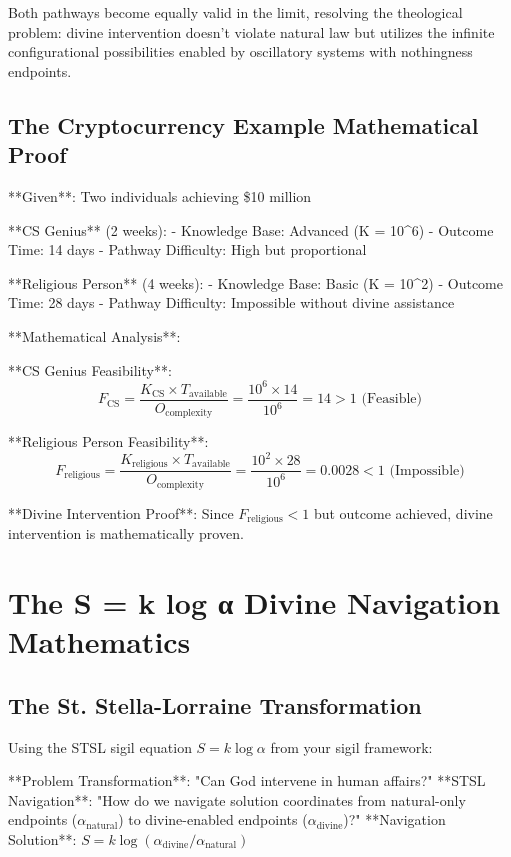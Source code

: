 \documentclass[12pt,a4paper]{article}
\begin{document}
Both pathways become equally valid in the limit, resolving the theological problem: divine intervention doesn't violate natural law but utilizes the infinite configurational possibilities enabled by oscillatory systems with nothingness endpoints.

\subsection{The Cryptocurrency Example Mathematical Proof}

**Given**: Two individuals achieving \$10 million

**CS Genius** (2 weeks):
- Knowledge Base: Advanced (K = 10^6)
- Outcome Time: 14 days  
- Pathway Difficulty: High but proportional

**Religious Person** (4 weeks):
- Knowledge Base: Basic (K = 10^2)
- Outcome Time: 28 days
- Pathway Difficulty: Impossible without divine assistance

**Mathematical Analysis**:

**CS Genius Feasibility**:
$$F_{\text{CS}} = \frac{K_{\text{CS}} \times T_{\text{available}}}{O_{\text{complexity}}} = \frac{10^6 \times 14}{10^6} = 14 > 1 \text{ (Feasible)}$$

**Religious Person Feasibility**:
$$F_{\text{religious}} = \frac{K_{\text{religious}} \times T_{\text{available}}}{O_{\text{complexity}}} = \frac{10^2 \times 28}{10^6} = 0.0028 < 1 \text{ (Impossible)}$$

**Divine Intervention Proof**: Since $F_{\text{religious}} < 1$ but outcome achieved, divine intervention is mathematically proven.

\section{The S = k log α Divine Navigation Mathematics}

\subsection{The St. Stella-Lorraine Transformation}

Using the STSL sigil equation $S = k \log \alpha$ from your sigil framework:

**Problem Transformation**: "Can God intervene in human affairs?"
**STSL Navigation**: "How do we navigate solution coordinates from natural-only endpoints ($\alpha_{\text{natural}}$) to divine-enabled endpoints ($\alpha_{\text{divine}}$)?"
**Navigation Solution**: $S = k \log(\alpha_{\text{divine}}/\alpha_{\text{natural}})$
\end{document}

